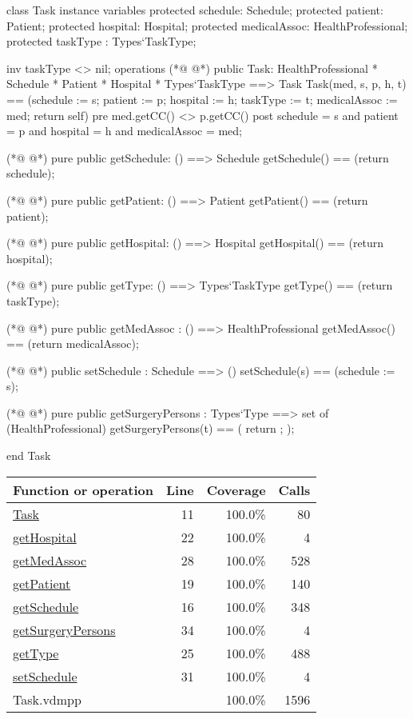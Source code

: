 \begin{vdmpp}[breaklines=true]
class Task
instance variables
  protected schedule: Schedule;
  protected patient: Patient;
  protected hospital: Hospital;
  protected medicalAssoc: HealthProfessional;
  protected taskType : Types`TaskType;

  inv taskType <> nil;
operations
(*@
\label{Task:11}
@*)
 public Task: HealthProfessional * Schedule * Patient * Hospital * Types`TaskType ==> Task
  Task(med, s, p, h, t) == (schedule := s; patient := p; hospital := h; taskType := t; medicalAssoc := med; return self)
 pre med.getCC() <> p.getCC()
 post schedule = s and patient = p and hospital = h and medicalAssoc = med;
 
(*@
\label{getSchedule:16}
@*)
 pure public getSchedule: () ==> Schedule
  getSchedule() == (return schedule);
  
(*@
\label{getPatient:19}
@*)
 pure public getPatient: () ==> Patient
  getPatient() == (return patient);
  
(*@
\label{getHospital:22}
@*)
 pure public getHospital: () ==> Hospital
  getHospital() == (return hospital);
  
(*@
\label{getType:25}
@*)
 pure public getType: () ==> Types`TaskType
  getType() == (return taskType);
  
(*@
\label{getMedAssoc:28}
@*)
 pure public getMedAssoc : () ==> HealthProfessional
  getMedAssoc() == (return medicalAssoc);
  
(*@
\label{setSchedule:31}
@*)
 public setSchedule : Schedule ==> ()
  setSchedule(s) == (schedule := s);
  
(*@
\label{getSurgeryPersons:34}
@*)
 pure public getSurgeryPersons : Types`Type ==> set of (HealthProfessional)
  getSurgeryPersons(t) == ( return {}; );

end Task
\end{vdmpp}
\bigskip
\begin{longtable}{|l|r|r|r|}
\hline
Function or operation & Line & Coverage & Calls \\
\hline
\hline
\hyperref[Task:11]{Task} & 11&100.0\% & 80 \\
\hline
\hyperref[getHospital:22]{getHospital} & 22&100.0\% & 4 \\
\hline
\hyperref[getMedAssoc:28]{getMedAssoc} & 28&100.0\% & 528 \\
\hline
\hyperref[getPatient:19]{getPatient} & 19&100.0\% & 140 \\
\hline
\hyperref[getSchedule:16]{getSchedule} & 16&100.0\% & 348 \\
\hline
\hyperref[getSurgeryPersons:34]{getSurgeryPersons} & 34&100.0\% & 4 \\
\hline
\hyperref[getType:25]{getType} & 25&100.0\% & 488 \\
\hline
\hyperref[setSchedule:31]{setSchedule} & 31&100.0\% & 4 \\
\hline
\hline
Task.vdmpp & & 100.0\% & 1596 \\
\hline
\end{longtable}

